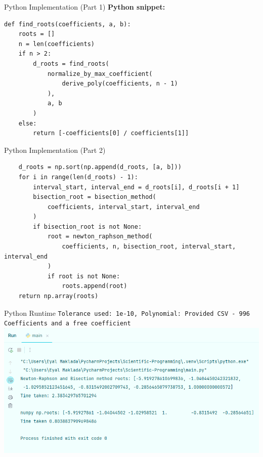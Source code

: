 \documentclass{beamer}
\begin{document}
\begin{frame}[fragile]{Python Implementation (Part 1)}
\textbf{Python snippet:}
\begin{lstlisting}
def find_roots(coefficients, a, b):
    roots = []
    n = len(coefficients)
    if n > 2:
        d_roots = find_roots(
            normalize_by_max_coefficient(
                derive_poly(coefficients, n - 1)
            ),
            a, b
        )
    else:
        return [-coefficients[0] / coefficients[1]]
\end{lstlisting}
\end{frame}

\begin{frame}[fragile]{Python Implementation (Part 2)}
\begin{lstlisting}
    d_roots = np.sort(np.append(d_roots, [a, b]))
    for i in range(len(d_roots) - 1):
        interval_start, interval_end = d_roots[i], d_roots[i + 1]
        bisection_root = bisection_method(
            coefficients, interval_start, interval_end
        )
        if bisection_root is not None:
            root = newton_raphson_method(
                coefficients, n, bisection_root, interval_start, interval_end
            )
            if root is not None:
                roots.append(root)
    return np.array(roots)
\end{lstlisting}
\end{frame}

\begin{frame}[fragile]{Python Runtime}
\texttt{Tolerance used: 1e-10, Polynomial: Provided CSV - 996 Coefficients and a free coefficient}
\includegraphics[width=1.0\textwidth]{python_runtime.png}
\end{frame}


\end{document}

